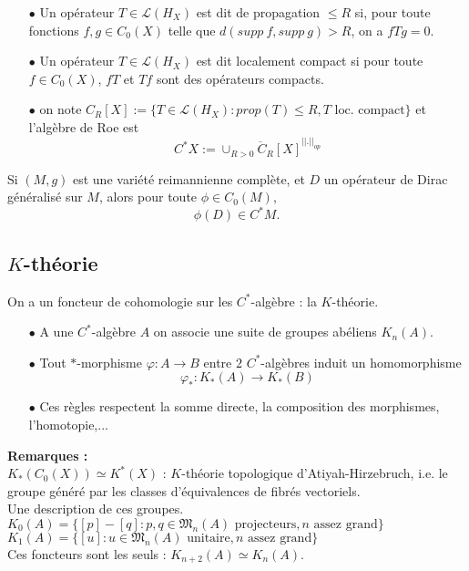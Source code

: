 \documentclass{beamer}
\begin{document}
\begin{frame}
\begin{definition}%
\begin{itemize}
\item[$\bullet$]Un opérateur $T\in \mathcal L(H_X)$ est dit de propagation $\leq R$ si, pour toute fonctions $f,g\in C_0(X)$ telle que $d(supp\ f, supp\ g) >R$, on a $fTg=0$.
\item[$\bullet$] Un opérateur $T\in \mathcal L(H_X)$ est dit localement compact si pour toute $f\in C_0(X)$, $fT$ et $Tf$ sont des opérateurs compacts.
\item[$\bullet$] on note $C_R[X]:=\{T\in \mathcal L(H_X) : prop(T)\leq R, T \text{ loc. compact}\}$ et l'algèbre de Roe est  \[C^*X:=\overline{\cup_{R>0} C_R[X]}^{||.||_{op}}\]
\end{itemize}
\end{definition}
Si $(M,g)$ est une variété reimannienne complète, et $D$ un opérateur de Dirac généralisé sur $M$, alors pour toute $\phi\in C_0(M)$,
\[\phi(D)\in C^*M.\]
\end{frame}

\subsection{$K$-théorie}
\begin{frame}
On a un foncteur de cohomologie sur les $C^*$-algèbre : la $K$-théorie.
\begin{itemize}
\item[$\bullet$] A une $C^*$-algèbre $A$ on associe une suite de groupes abéliens $K_n(A)$.
\item[$\bullet$] Tout $*$-morphisme $\varphi : A\rightarrow B$ entre $2$ $C^*$-algèbres induit un homomorphisme 
\[\varphi_*: K_*(A)\rightarrow K_*(B)\]
\item[$\bullet$] Ces règles respectent la somme directe, la composition des morphismes, l'homotopie,... 
\end{itemize}
\textbf{Remarques :}\\
$K_*(C_0(X))\simeq K^*(X)$ : $K$-théorie topologique d'Atiyah-Hirzebruch, i.e. le groupe généré par les classes d'équivalences de fibrés vectoriels.\\
Une description de ces groupes.
$K_0(A) = \{[p]-[q] : p,q\in \mathfrak M_n(A) \text{ projecteurs} ,n\text{ assez grand}\}$\\
$K_1(A) = \{[u] : u\in \mathfrak M_n(A) \text{ unitaire} ,n\text{ assez grand}\}$\\
Ces foncteurs sont les seuls : $K_{n+2}(A)\simeq K_n(A)$.
\end{frame}
\end{document}
